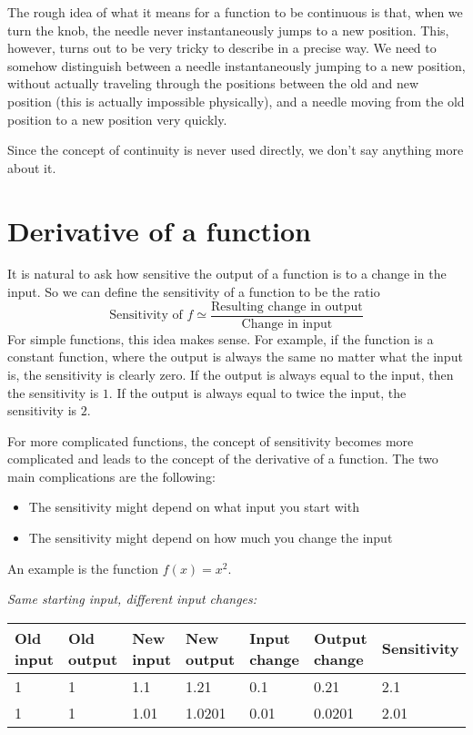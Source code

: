 \documentclass{math-deane}
\begin{document}
The rough idea of what it means for a function to be continuous is that, when we turn the knob, the needle never instantaneously jumps to a new position. This, however, turns out to be very tricky to describe in a precise way. We need to somehow distinguish between a needle instantaneously jumping to a new position, without actually traveling through the positions between the old and new position (this is actually impossible physically), and a needle moving from the old position to a new position very quickly.

Since the concept of continuity is never used directly, we don't say anything more about it.

\section{Derivative of a function}

It is natural to ask how sensitive the output of a function is to a change in the input. So we can define the sensitivity of a function to be the ratio
\[
\text{Sensitivity of }f \simeq \frac{\text{Resulting change in output}}{\text{Change in input}}
\]
For simple functions, this idea makes sense. For example, if the function is a constant function, where the output is always the same no matter what the input is, the sensitivity is clearly zero. If the output is always equal to the input, then the sensitivity is $1$. If the output is always equal to twice the input, the sensitivity is $2$.

For more complicated functions, the concept of sensitivity becomes more complicated and leads to the concept of the derivative of a function. The two main complications are the following:
\begin{itemize}
\item The sensitivity might depend on what input you start with
\item The sensitivity might depend on how much you change the input
\end{itemize}

An example is the function $f(x) = x^2$. 

{\em Same starting input, different input changes:}\\
\begin{tabular}{|p{0.5in}|p{0.5in}|p{0.5in}|p{0.5in}|p{0.5in}|p{0.5in}|p{0.75in}|}
\hline
Old input&Old output&New input& New output & Input change &
Output change & Sensitivity \\ \hline\hline
1 & 1 & 1.1 & 1.21 & 0.1 & 0.21 & 2.1\\ \hline
1 & 1 & 1.01 & 1.0201 & 0.01 & 0.0201 & 2.01\\ \hline
\end{tabular}
\end{document}
